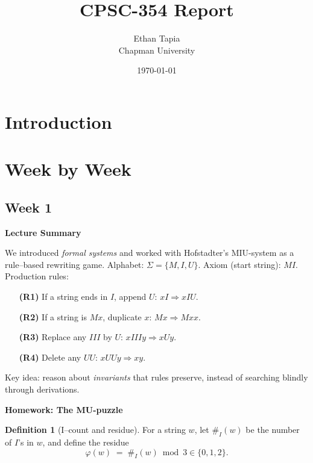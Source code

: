 \documentclass{article}
\title{CPSC-354 Report}
\author{Ethan Tapia  \\ Chapman University}
\date{\today}
\theoremstyle{plain}
\theoremstyle{definition}
\newtheorem{definition}[theorem]{Definition}
\theoremstyle{remark}
\begin{document}
\maketitle

\begin{abstract}
\end{abstract}

\setcounter{tocdepth}{3}
\tableofcontents

\section{Introduction}\label{intro}

\section{Week by Week}\label{homework}

\subsection{Week 1}

\textbf{Lecture Summary}

We introduced \emph{formal systems} and worked with Hofstadter’s MIU-system as a rule–based rewriting game.  
Alphabet: $\Sigma=\{M,I,U\}$.  
Axiom (start string): $MI$.  
Production rules:
\begin{enumerate}
    \item[\textbf{(R1)}] If a string ends in $I$, append $U$: $xI \Rightarrow xIU$.
    \item[\textbf{(R2)}] If a string is $Mx$, duplicate $x$: $Mx \Rightarrow Mxx$.
    \item[\textbf{(R3)}] Replace any $III$ by $U$: $xIIIy \Rightarrow xUy$.
    \item[\textbf{(R4)}] Delete any $UU$: $xUUy \Rightarrow xy$.
\end{enumerate}
Key idea: reason about \emph{invariants} that rules preserve, instead of searching blindly through derivations.

\bigskip
\textbf{Homework: The MU-puzzle}

\begin{definition}[I–count and residue]
For a string $w$, let $\#_I(w)$ be the number of $I$’s in $w$, and define the residue
\[
\varphi(w) \;=\; \#_I(w) \bmod 3 \in \{0,1,2\}.
\]
\end{definition}
\end{document}
